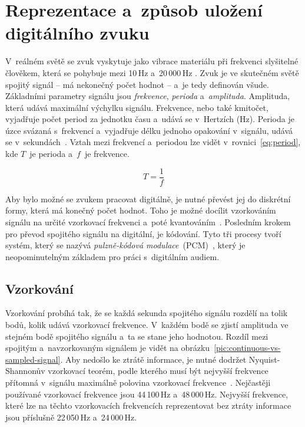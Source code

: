 \section{Reprezentace a~způsob uložení digitálního zvuku}
\label{sec:digital-sound-representation}

V~reálném světě se zvuk vyskytuje jako vibrace materiálu při frekvenci
slyšitelné člověkem, která se pohybuje mezi 10\,Hz a~20\,000\,Hz
\cite{Swanson1998}. Zvuk je ve skutečném světě spojitý signál -- má nekonečný
počet hodnot -- a~je tedy definován všude. Základními parametry signálu jsou
\textit{frekvence}, \textit{perioda} a~\textit{amplituda}. Amplituda, která
udává maximální výchylku signálu. Frekvence, nebo také kmitočet, vyjadřuje
počet period za jednotku času a~udává se v~Hertzích (Hz). Perioda je úzce
svázaná s~frekvencí a~vyjadřuje délku jednoho opakování v~signálu, udává se
v~sekundách~\cite{Cernocky2021}. Vztah mezi frekvencí a~periodou lze vidět
v~rovnici~\ref{eq:period}, kde $T$~je perioda a~$f$~je frekvence.

\begin{equation}
    \label{eq:period}
    T = \frac{1}{f}
\end{equation}

Aby bylo možné se zvukem pracovat
digitálně, je nutné převést jej do diskrétní formy, která má konečný počet
hodnot. Toho je možné docílit vzorkováním signálu na určité vzorkovací
frekvenci a~poté kvantováním~\cite{Cernocky2021}. Posledním krokem pro převod
spojitého signálu na digitální, je kódování. Tyto tři procesy tvoří systém,
který se nazývá \textit{pulzně-kódová modulace}~(PCM)~\cite{Oliver1948}, který
je neopominutelným základem pro práci s~digitálním audiem.

\subsection*{Vzorkování}
\label{sub:sampling}

Vzorkování probíhá tak, že se každá sekunda spojitého signálu rozdělí na tolik
bodů, kolik udává vzorkovací frekvence. V~každém bodě se zjistí amplituda ve
stejném bodě spojitého signálu a~ta se stane jeho hodnotou. Rozdíl mezi
spojitým a~navzorkovaným signálem je vidět na
obrázku~\ref{pic:continuous-vs-sampled-signal}. Aby nedošlo ke ztrátě
informace, je nutné dodržet Nyquist-Shannonův vzorkovací teorém, podle kterého
musí být nejvyšší frekvence přítomná v~signálu maximálně polovina vzorkovací
frekvence~\cite{Shannon1949}. Nejčastěji používané vzorkovací frekvence jsou
44\,100\,Hz a~48\,000\,Hz. Nejvyšší frekvence, které lze na těchto vzorkovacích
frekvencích reprezentovat bez ztráty informace jsou příslušně 22\,050\,Hz
a~24\,000\,Hz.

